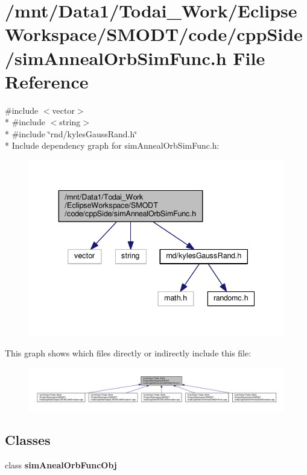 \section{/mnt/\-Data1/\-Todai\-\_\-\-Work/\-Eclipse\-Workspace/\-S\-M\-O\-D\-T/code/cpp\-Side/sim\-Anneal\-Orb\-Sim\-Func.h File Reference}
\label{sim_anneal_orb_sim_func_8h}
{\ttfamily \#include $<$vector$>$}\\*
{\ttfamily \#include $<$string$>$}\\*
{\ttfamily \#include \char`\"{}rnd/kyles\-Gauss\-Rand.\-h\char`\"{}}\\*
Include dependency graph for sim\-Anneal\-Orb\-Sim\-Func.\-h\-:
\nopagebreak
\begin{figure}[H]
\begin{center}
\leavevmode
\includegraphics[width=339pt]{sim_anneal_orb_sim_func_8h__incl}
\end{center}
\end{figure}
This graph shows which files directly or indirectly include this file\-:
\nopagebreak
\begin{figure}[H]
\begin{center}
\leavevmode
\includegraphics[width=350pt]{sim_anneal_orb_sim_func_8h__dep__incl}
\end{center}
\end{figure}
\subsection*{Classes}
\begin{DoxyCompactItemize}
\item 
class {\bf sim\-Aneal\-Orb\-Func\-Obj}
\end{DoxyCompactItemize}
